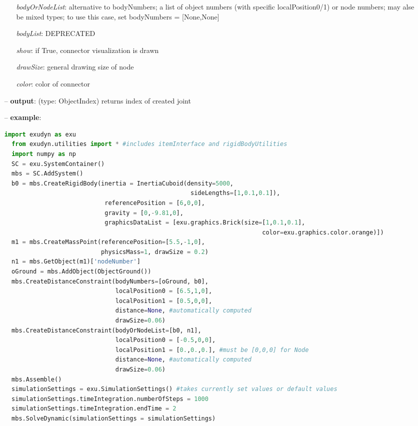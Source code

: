 \begin{itemize}[leftmargin=0.7cm]
\begin{itemize}[leftmargin=1.2cm]
\item[]{\it bodyOrNodeList}: alternative to bodyNumbers; a list of object numbers (with specific localPosition0/1) or node numbers; may alse be mixed types; to use this case, set bodyNumbers = [None,None]
\item[]{\it bodyList}: DEPRECATED
\item[]{\it show}: if True, connector visualization is drawn
\item[]{\it drawSize}: general drawing size of node
\item[]{\it color}: color of connector
\end{itemize}
\item[--]
{\bf output}: (type: ObjectIndex) returns index of created joint
\item[--]
{\bf example}: \vspace{-12pt}\ei\begin{lstlisting}[language=Python, xleftmargin=36pt]
  import exudyn as exu
  from exudyn.utilities import * #includes itemInterface and rigidBodyUtilities
  import numpy as np
  SC = exu.SystemContainer()
  mbs = SC.AddSystem()
  b0 = mbs.CreateRigidBody(inertia = InertiaCuboid(density=5000,
                                                    sideLengths=[1,0.1,0.1]),
                            referencePosition = [6,0,0],
                            gravity = [0,-9.81,0],
                            graphicsDataList = [exu.graphics.Brick(size=[1,0.1,0.1],
                                                                        color=exu.graphics.color.orange)])
  m1 = mbs.CreateMassPoint(referencePosition=[5.5,-1,0],
                           physicsMass=1, drawSize = 0.2)
  n1 = mbs.GetObject(m1)['nodeNumber']
  oGround = mbs.AddObject(ObjectGround())
  mbs.CreateDistanceConstraint(bodyNumbers=[oGround, b0],
                               localPosition0 = [6.5,1,0],
                               localPosition1 = [0.5,0,0],
                               distance=None, #automatically computed
                               drawSize=0.06)
  mbs.CreateDistanceConstraint(bodyOrNodeList=[b0, n1],
                               localPosition0 = [-0.5,0,0],
                               localPosition1 = [0.,0.,0.], #must be [0,0,0] for Node
                               distance=None, #automatically computed
                               drawSize=0.06)
  mbs.Assemble()
  simulationSettings = exu.SimulationSettings() #takes currently set values or default values
  simulationSettings.timeIntegration.numberOfSteps = 1000
  simulationSettings.timeIntegration.endTime = 2
  mbs.SolveDynamic(simulationSettings = simulationSettings)
\end{lstlisting}\vspace{-24pt}\bi\item[]\vspace{-24pt}\vspace{12pt}\end{itemize}
%

